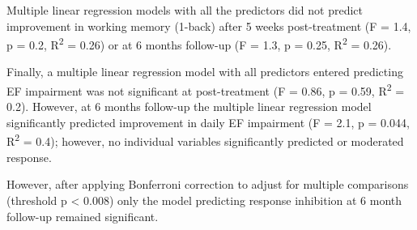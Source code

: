 \documentclass[
  letterpaper,
]{ut-thesis}
\begin{document}
Multiple linear regression models with all the predictors did not
predict improvement in working memory (1-back) after 5 weeks
post-treatment (F = 1.4, p = 0.2, R\textsuperscript{2} = 0.26) or at 6
months follow-up (F = 1.3, p = 0.25, R\textsuperscript{2} = 0.26).

Finally, a multiple linear regression model with all predictors entered
predicting EF impairment was not significant at post-treatment (F =
0.86, p = 0.59, R\textsuperscript{2} = 0.2). However, at 6 months
follow-up the multiple linear regression model significantly predicted
improvement in daily EF impairment (F = 2.1, p = 0.044,
R\textsuperscript{2} = 0.4); however, no individual variables
significantly predicted or moderated response.

However, after applying Bonferroni correction to adjust for multiple
comparisons (threshold p \textless{} 0.008) only the model predicting
response inhibition at 6 month follow-up remained significant.
\end{document}
